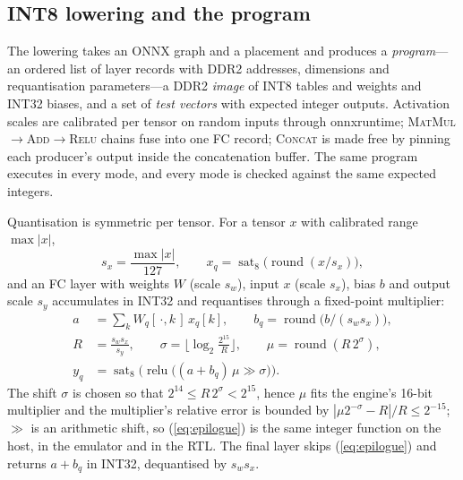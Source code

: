 \documentclass[lettersize,journal]{IEEEtran}
\begin{document}
\subsection{INT8 lowering and the program}
The lowering takes an ONNX graph and a placement and produces a \emph{program}---an ordered list of layer records with DDR2 addresses, dimensions and requantisation parameters---a DDR2 \emph{image} of INT8 tables and weights and INT32 biases, and a set of \emph{test vectors} with expected integer outputs. Activation scales are calibrated per tensor on random inputs through onnxruntime; \textsc{MatMul}$\rightarrow$\textsc{Add}$\rightarrow$\textsc{Relu} chains fuse into one FC record; \textsc{Concat} is made free by pinning each producer's output inside the concatenation buffer. The same program executes in every mode, and every mode is checked against the same expected integers.

Quantisation is symmetric per tensor. For a tensor $x$ with calibrated range $\max|x|$,
\begin{equation}
s_x = \frac{\max|x|}{127}, \qquad x_q = \operatorname{sat}_8\!\big(\operatorname{round}(x/s_x)\big),
\label{eq:quant}
\end{equation}
and an FC layer with weights $W$ (scale $s_w$), input $x$ (scale $s_x$), bias $b$ and output scale $s_y$ accumulates in INT32 and requantises through a fixed-point multiplier:
\begin{align}
a &= \textstyle\sum_k W_q[\,\cdot,k\,]\,x_q[k], \qquad b_q = \operatorname{round}\!\big(b/(s_w s_x)\big), \label{eq:acc}\\
R &= \frac{s_w s_x}{s_y}, \qquad \sigma = \Big\lfloor \log_2 \frac{2^{15}}{R} \Big\rfloor, \qquad \mu = \operatorname{round}(R\,2^{\sigma}), \label{eq:mult}\\
y_q &= \operatorname{sat}_8\!\Big(\operatorname{relu}\big((a + b_q)\,\mu \gg \sigma\big)\Big). \label{eq:epilogue}
\end{align}
The shift $\sigma$ is chosen so that $2^{14} \le R\,2^{\sigma} < 2^{15}$, hence $\mu$ fits the engine's 16-bit multiplier and the multiplier's relative error is bounded by $|\mu 2^{-\sigma} - R|/R \le 2^{-15}$; $\gg$ is an arithmetic shift, so (\ref{eq:epilogue}) is the same integer function on the host, in the emulator and in the RTL. The final layer skips (\ref{eq:epilogue}) and returns $a + b_q$ in INT32, dequantised by $s_w s_x$.
\end{document}
